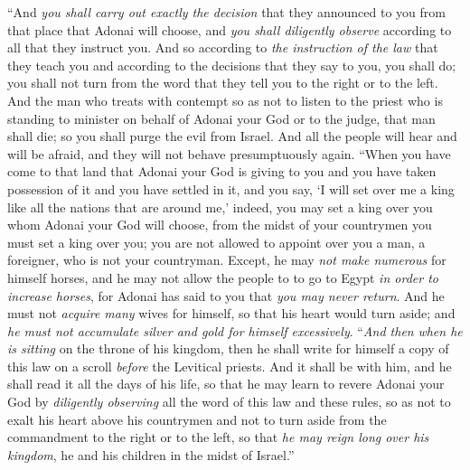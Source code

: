 \begin{biblechapter}
\verse “And \textit{you shall carry out exactly the decision} that they announced to you from that place that Adonai will choose, and \textit{you shall diligently observe} according to all that they instruct you.
\verse And so according to \textit{the instruction of the law} that they teach you and according to the decisions that they say to you, you shall do; you shall not turn from the word that they tell you to the right or to the left.
\verse And the man who treats with contempt so as not to listen to the priest who is standing to minister on behalf of Adonai your God or to the judge, that man shall die; so you shall purge the evil from Israel.
\verse And all the people will hear and will be afraid, and they will not behave presumptuously again.
\verse “When you have come to that land that Adonai your God is giving to you and you have taken possession of it and you have settled in it, and you say, ‘I will set over me a king like all the nations that are around me,’
\verse indeed, you may set a king over you whom Adonai your God will choose, from the midst of your countrymen you must set a king over you; you are not allowed to appoint over you a man, a foreigner, who is not your countryman.
\verse Except, he may \textit{not make numerous} for himself horses, and he may not allow the people to to go to Egypt \textit{in order to increase horses}, for Adonai has said to you that \textit{you may never return}.
\verse And he must not \textit{acquire many} wives for himself, so that his heart would turn aside; and \textit{he must not accumulate silver and gold for himself excessively}.
\verse “\textit{And then} \textit{when he is sitting} on the throne of his kingdom, then he shall write for himself a copy of this law on a scroll \textit{before} the Levitical priests.
\verse And it shall be with him, and he shall read it all the days of his life, so that he may learn to revere Adonai your God by \textit{diligently observing} all the word of this law and these rules,
\verse so as not to exalt his heart above his countrymen and not to turn aside from the commandment to the right or to the left, so that \textit{he may reign long over his kingdom}, he and his children in the midst of Israel.”
\end{biblechapter}

